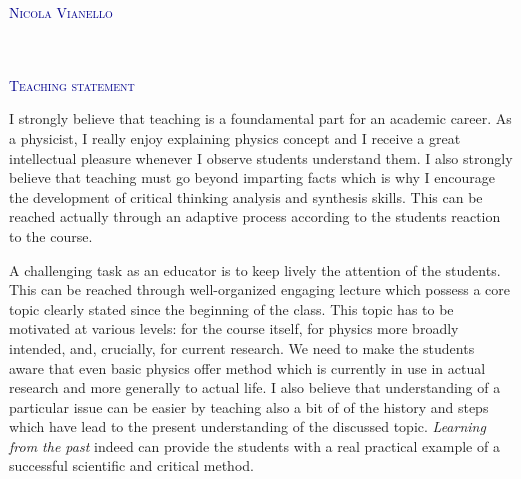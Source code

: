 \documentclass[12pt,a4paper]{article}
\begin{document}
\begin{flushright}
\textcolor{darkBlue}{ \Huge
\lettrine[lines=3,findent=-1pt, loversize = -0.42,
lraise=0.6]{N}{icola Vianello}}\\[2pt]
\textcolor{Gray}{}\\
\textcolor{Gray}{}\\
\textcolor{Gray}{}
\end{flushright}
\begin{flushleft} 
\textcolor{darkBlue}{ \Huge
\lettrine[lines=2,findent=-1pt, loversize = -0.42,
lraise=0.6]{T}{eaching statement}} 
\end{flushleft}
I strongly believe that teaching is a foundamental part for an
academic career. As a physicist, I really enjoy explaining physics
concept and I receive a great intellectual pleasure whenever I observe
students understand them. I also strongly believe that teaching must
go beyond imparting facts which is why I encourage the development of
critical thinking analysis and synthesis skills. This can be reached
actually through an adaptive process according to the students
reaction to the course. 

A challenging task as an educator is to keep lively the attention of
the students. This can be reached through well-organized engaging
lecture which possess a core topic clearly stated since the beginning
of the class. This topic has to be motivated at various levels: 
for the course itself, for physics more broadly intended, and, crucially, for current research.
We need to make the students aware
 that even basic physics offer method which is currently in use in
 actual research and more generally to actual life. I also believe that understanding of a particular
issue can be easier by teaching also a bit of 
of the history and steps which have lead to the present understanding
of the discussed topic. \emph{Learning from the past} indeed can provide the
students with a real practical example of a successful scientific
and critical method. 
\end{document}
